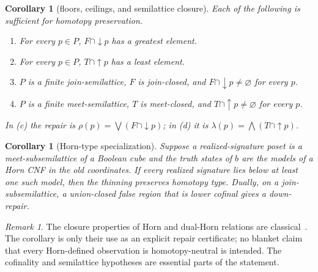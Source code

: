 \documentclass[11pt]{article}
\newtheorem{corollary}[theorem]{Corollary}
\theoremstyle{definition}
\theoremstyle{remark}
\newtheorem{remark}[theorem]{Remark}
\begin{document}
\begin{corollary}[floors, ceilings, and semilattice closure]\label{cor:closure}
Each of the following is sufficient for homotopy preservation.
\begin{enumerate}[label=(\alph*)]
\item For every $p\in P$, $F\cap\downarrow p$ has a greatest element.
\item For every $p\in P$, $T\cap\uparrow p$ has a least element.
\item $P$ is a finite join-semilattice, $F$ is join-closed, and
$F\cap\downarrow p\ne\varnothing$ for every $p$.
\item $P$ is a finite meet-semilattice, $T$ is meet-closed, and
$T\cap\uparrow p\ne\varnothing$ for every $p$.
\end{enumerate}
In (c) the repair is $\rho(p)=\bigvee(F\cap\downarrow p)$; in (d) it is
$\lambda(p)=\bigwedge(T\cap\uparrow p)$.
\end{corollary}

\begin{corollary}[Horn-type specialization]\label{cor:horn}
Suppose a realized-signature poset is a meet-subsemilattice of a Boolean cube and the
truth states of $b$ are the models of a Horn CNF in the old coordinates.  If every
realized signature lies below at least one such model, then the thinning preserves
homotopy type.  Dually, on a join-subsemilattice, a union-closed false region that is
lower cofinal gives a down-repair.
\end{corollary}

\begin{remark}
The closure properties of Horn and dual-Horn relations are classical~\cite{JeavonsCohenGyssens1997,Wild2017}.
The corollary is only their use as an explicit repair certificate; no blanket claim
that every Horn-defined observation is homotopy-neutral is intended.  The cofinality
and semilattice hypotheses are essential parts of the statement.
\end{remark}
\end{document}
